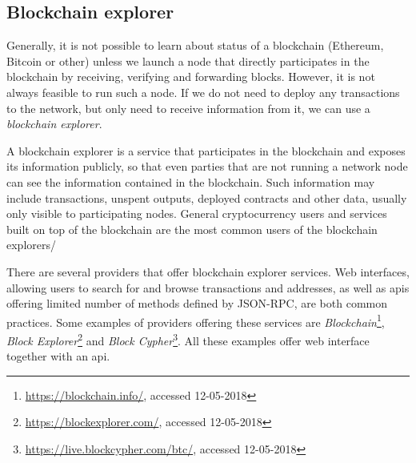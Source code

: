 \subsection{Blockchain explorer}
Generally, it is not possible to learn about status of a blockchain (Ethereum, Bitcoin or other) unless we launch a node that directly participates in the blockchain by receiving, verifying and forwarding blocks. However, it is not always feasible to run such a node. If we do not need to deploy any transactions to the network, but only need to receive information from it, we can use a \textit{blockchain explorer}.

A blockchain explorer is a service that participates in the blockchain and exposes its information publicly, so that even parties that are not running a network node can see the information contained in the blockchain\footnotemark. Such information may include transactions, unspent outputs, deployed contracts and other data, usually only visible to participating nodes. 
% 
% 
General cryptocurrency users and services built on top of the blockchain are the most common users of the blockchain explorers\footnotemark/
%

There are several providers that offer blockchain explorer services. Web interfaces, allowing users to search for and browse transactions and addresses, as well as \acrshort{api}s offering limited number of methods defined by JSON-RPC, are both common practices. Some examples of providers offering these services are \textit{Blockchain}\footnote{\url{https://blockchain.info/}, accessed 12-05-2018}, \textit{Block Explorer}\footnote{\url{https://blockexplorer.com/}, accessed 12-05-2018} and \textit{Block Cypher}\footnote{\url{https://live.blockcypher.com/btc/}, accessed 12-05-2018}. All these examples offer web interface together with an \acrshort{api}.